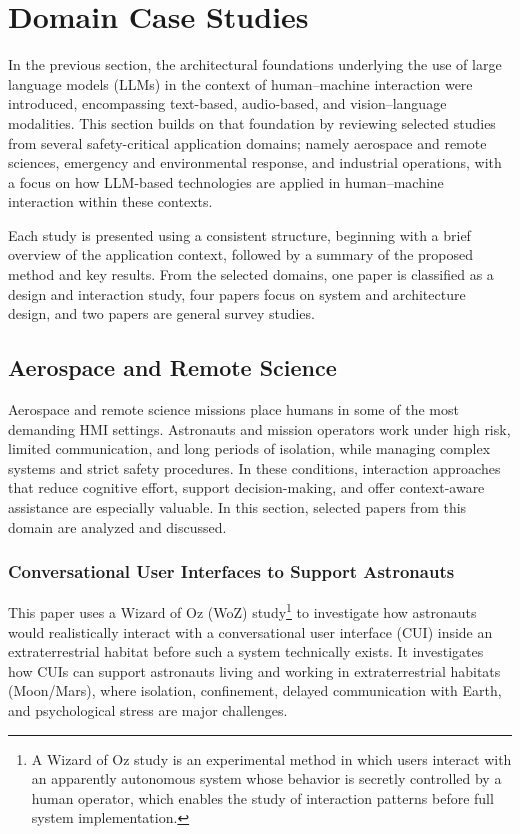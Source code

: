 \section{Domain Case Studies}
\label{sec:cases}

In the previous section, the architectural foundations underlying the use of large language models (LLMs) in the context of human–machine interaction were introduced, encompassing text-based, audio-based, and vision–language modalities.
This section builds on that foundation by reviewing selected studies from several safety-critical application domains; namely aerospace and remote sciences, emergency and environmental response, and industrial operations, with a focus on how LLM-based technologies are applied in human–machine interaction within these contexts.

Each study is presented using a consistent structure, beginning with a brief overview of the application context, followed by a summary of the proposed method and key results. 
From the selected domains, one paper is classified as a design and interaction study, four papers focus on system and architecture design, and two papers are general survey studies.

\subsection{Aerospace and Remote Science}
Aerospace and remote science missions place humans in some of the most demanding HMI settings.
Astronauts and mission operators work under high risk, limited communication, and long periods of isolation, while managing complex systems and strict safety procedures.
In these conditions, interaction approaches that reduce cognitive effort, support decision-making, and offer context-aware assistance are especially valuable.
In this section, selected papers from this domain are analyzed and discussed.

\subsubsection{Conversational User Interfaces to Support Astronauts \cite{freitas2021conversational}}

This paper uses a Wizard of Oz (WoZ) study\footnote{A Wizard of Oz study is an experimental method in which users interact with an apparently autonomous system whose behavior is secretly controlled by a human operator, which enables the study of interaction patterns before full system implementation.\cite{dahlback1993wizard}} to investigate how astronauts would realistically interact with a conversational user interface (CUI) inside an extraterrestrial habitat before such a system technically exists.
It investigates how CUIs can support astronauts living and working in extraterrestrial habitats (Moon/Mars), where isolation, confinement, delayed communication with Earth, and psychological stress are major challenges.

